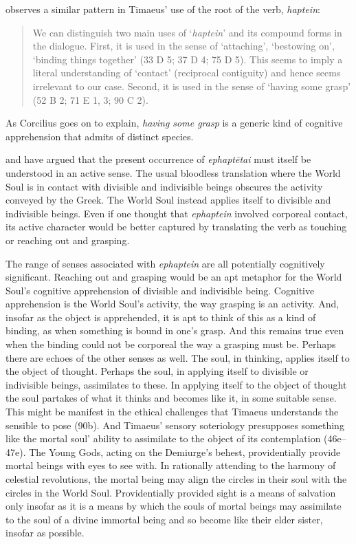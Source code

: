 \citet[]{Corcilius:2018bd} observes a similar pattern in Timaeus' use of the root of the verb, \emph{haptein}:
\begin{quote}
	We can distinguish two main uses of `\emph{haptein}' and its compound forms in the dialogue. First, it is used in the sense of `attaching', `bestowing on', `binding things together' (33 D 5; 37 D 4; 75 D 5). This seems to imply a literal understanding of `contact' (reciprocal contiguity) and hence seems irrelevant to our case. Second, it is used in the sense of `having some grasp' (52 B 2; 71 E 1, 3; 90 C 2). \citep[85]{Corcilius:2018bd}
\end{quote}
As Corcilius goes on to explain, \emph{having some grasp} is a generic kind of cognitive apprehension that admits of distinct species.

\citealt{Corcilius:2018bd} and \citet[]{Betegh:2019fq} have argued that the present occurrence of \emph{ephaptētai} must itself be understood in an active sense. The usual bloodless translation where the World Soul is in contact with divisible and indivisible beings obscures the activity conveyed by the Greek. The World Soul instead applies itself to divisible and indivisible beings. Even if one thought that \emph{ephaptein} involved corporeal contact, its active character would be better captured by translating the verb as touching or reaching out and grasping.

The range of senses associated with \emph{ephaptein} are all potentially cognitively significant. Reaching out and grasping would be an apt metaphor for the World Soul's cognitive apprehension of divisible and indivisible being. Cognitive apprehension is the World Soul's activity, the way grasping is an activity. And, insofar as the object is apprehended, it is apt to think of this as a kind of binding, as when something is bound in one's grasp. And this remains true even when the binding could not be corporeal the way a grasping must be. Perhaps there are echoes of the other senses as well. The soul, in thinking, applies itself to the object of thought. Perhaps the soul, in applying itself to divisible or indivisible beings, assimilates to these. In applying itself to the object of thought the soul partakes of what it thinks and becomes like it, in some suitable sense. This might be manifest in the ethical challenges that Timaeus understands the sensible to pose (90b). And Timaeus' sensory soteriology presupposes something like the mortal soul' ability to assimilate to the object of its contemplation (46e--47e). The Young Gods, acting on the Demiurge's behest, providentially provide mortal beings with eyes to see with. In rationally attending to the harmony of celestial revolutions, the mortal being may align the circles in their soul with the circles in the World Soul. Providentially provided sight is a means of salvation only insofar as it is a means by which the souls of mortal beings may assimilate to the soul of a divine immortal being and so become like their elder sister, insofar as possible.


